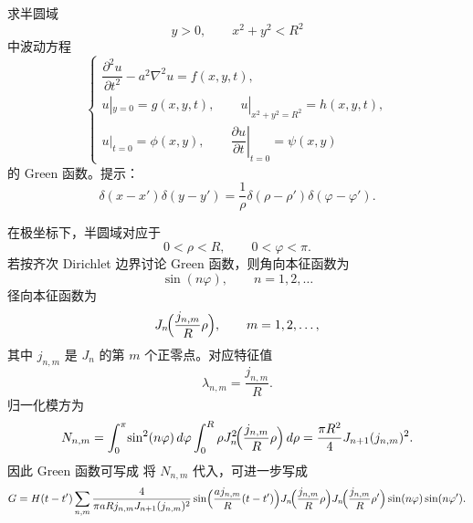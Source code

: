 \begin{question}

求半圆域
\[
 y>0,\qquad x^2+y^2<R^2
\]
中波动方程
\[
\begin{cases}
\dfrac{\partial^2u}{\partial t^2}-a^2\nabla^2u=f(x,y,t),\\
u|_{y=0}=g(x,y,t),\qquad u|_{x^2+y^2=R^2}=h(x,y,t),\\
u|_{t=0}=\phi(x,y),\qquad \left.\dfrac{\partial u}{\partial t}\right|_{t=0}=\psi(x,y)
\end{cases}
\]
的 Green 函数。提示：
\[
\delta(x-x')\delta(y-y')=\frac1\rho\delta(\rho-\rho')\delta(\varphi-\varphi').
\]

\begin{solution}

在极坐标下，半圆域对应于
\[
 0<\rho<R,\qquad 0<\varphi<\pi.
\]
若按齐次 Dirichlet 边界讨论 Green 函数，则角向本征函数为
\[
 \sin(n\varphi),\qquad n=1,2,\dots
\]
径向本征函数为
\[
 J_n\!\Bigl(\frac{j_{n,m}}{R}\rho\Bigr),
\qquad m=1,2,\dots,
\]
其中 $j_{n,m}$ 是 $J_n$ 的第 $m$ 个正零点。对应特征值
\[
 \lambda_{n,m}=\frac{j_{n,m}}{R}.
\]
归一化模方为
\[
N_{n,m}=
\int_0^{\pi}\!\sin^2(n\varphi)\,d\varphi
\int_0^R \rho J_n^2\!\Bigl(\frac{j_{n,m}}{R}\rho\Bigr)\,d\rho
=\frac{\pi R^2}{4}J_{n+1}(j_{n,m})^2.
\]
因此 Green 函数可写成
将 $N_{n,m}$ 代入，可进一步写成
\[
G=H(t-t')\sum_{n,m}
\frac{4}{\pi a R j_{n,m}J_{n+1}(j_{n,m})^2}
\sin\Bigl(\frac{a j_{n,m}}{R}(t-t')\Bigr)
J_n\!\Bigl(\frac{j_{n,m}}{R}\rho\Bigr)
J_n\!\Bigl(\frac{j_{n,m}}{R}\rho'\Bigr)
\sin(n\varphi)\sin(n\varphi').
\]

\end{solution}
\end{question}

